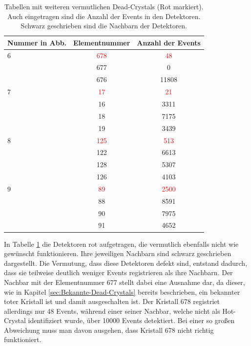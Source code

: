 \documentclass[a4paper,11pt,oneside,final,german,openbib,pdftex]{scrbook}
\begin{document}
{\begin{table}[h!]
\begin{center}
 \begin{tabular}{|l|c|c|}
 
 	\hline
 	Nummer in Abb. & Elementnummer&Anzahl der Events \\
	 \hline
 	\hline
 	6& \textcolor{red}{678} &\textcolor{red}{48} \\
 	\cline{2-3} 
 	 & 677&0 \\
 	\cline{2-3}
 	 & 676& 11808\\ 
 	
 	\hline
 	\hline
 	7& \textcolor{red}{17} &\textcolor{red}{21} \\
 	\cline{2-3}
 	& 16 & 3311\\
 	\cline{2-3}
 	& 18& 7175 \\
 	\cline{2-3}
 	 & 19& 3439 \\
 	\hline
 	\hline
 	
 	8 & \textcolor{red}{125} &\textcolor{red}{513} \\
 	\cline{2-3}
 	
 	 & 122& 6613\\
 	\cline{2-3}
 	 & 128 & 5307 \\
 	\cline{2-3}
 	& 126 & 4103 \\
 	\hline
 	\hline
 	
 	9 & \textcolor{red}{89}& \textcolor{red}{2500}\\
 	\cline{2-3}
 	& 88& 8591\\
 	\cline{2-3}
 	&90&7975 \\
 	\cline{2-3}
 	&91&4652 \\
 	\hline
 	
 	
 	\end{tabular}
 \caption[Vermutete Dead-Crystals und ihre Nachbarn mit Anzahl ihrer Events]{Tabellen mit weiteren vermutlichen Dead-Crystals (Rot markiert). Auch eingetragen sind die Anzahl der Events in den Detektoren. Schwarz geschrieben sind die Nachbarn der Detektoren.}
\label{tab:Vermutete-Dead-Crystals} 
\end{center}
 \end{table}
 
 In Tabelle \ref{tab:Vermutete-Dead-Crystals} die Detektoren rot aufgetragen, die vermutlich ebenfalls nicht wie gew\"unscht funktionieren. Ihre jeweiligen Nachbarn sind schwarz geschrieben dargestellt. Die Vermutung, dass diese Detektoren defekt sind, entstand dadurch, dass sie teilweise deutlich weniger Events registrieren als ihre Nachbarn. Der Nachbar mit der Elementnummer 677 stellt dabei eine Ausnahme dar, da dieser, wie in Kapitel \ref{sec:Bekannte-Dead-Crystals} bereits beschrieben, ein bekannter toter Kristall ist und damit ausgeschalten ist. Der Kristall 678 registriet allerdings nur 48 Events, w\"ahrend einer seiner Nachbar, welche nicht als Hot-Crystal identifiziert wurde, \"uber 10000 Events detektiert. Bei einer so gro{\ss}en Abweichung muss man davon ausgehen, dass Kristall 678 nicht richtig funktioniert.  
 
}
\end{document}
